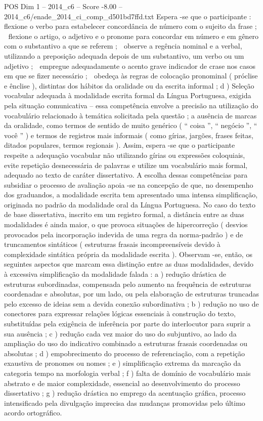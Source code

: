 \begin{textsample}{POS Dim 1 – 2014\_c6 – Score -8.00 – 2014\_c6/enade\_2014\_ci\_comp\_d501bd7ffd.txt}
Espera -se que o participante :  flexione o verbo para estabelecer concordância de número com o sujeito da frase ;  flexione o artigo, o adjetivo e o pronome para concordar em número e em gênero com o substantivo a que se referem ;  observe a regência nominal e a verbal, utilizando a preposição adequada depois de um substantivo, um verbo ou um adjetivo ;  empregue adequadamente o acento grave indicador de crase nos casos em que se fizer necessário ;  obedeça às regras de colocação pronominal ( próclise e ênclise ), distintas dos hábitos da oralidade ou da escrita informal ; d ) Seleção vocabular adequada à modalidade escrita formal da Língua Portuguesa, exigida pela situação comunicativa – essa competência envolve a precisão na utilização do vocabulário relacionado à temática solicitada pela questão ; a ausência de marcas da oralidade, como termos de sentido de muito genérico ( “ coisa ”, “ negócio ”, “ você ” ) e termos de registros mais informais ( como gírias, jargões, frases feitas, ditados populares, termos regionais ).
Assim, espera -se que o participante respeite a adequação vocabular não utilizando gírias ou expressões coloquiais, evite repetição desnecessária de palavras e utilize um vocabulário mais formal, adequado ao texto de caráter dissertativo.
A escolha dessas competências para subsidiar o processo de avaliação apoia -se na concepção de que, no desempenho dos graduandos, a modalidade escrita tem apresentado uma intensa simplificação, originada no padrão da modalidade oral da Língua Portuguesa.
No caso do texto de base dissertativa, inscrito em um registro formal, a distância entre as duas modalidades é ainda maior, o que provoca situações de hipercorreção ( desvios provocados pela incorporação indevida de uma regra da norma-padrão ) e de truncamentos sintáticos ( estruturas frasais incompreensíveis devido à complexidade sintática própria da modalidade escrita ).
Observam -se, então, os seguintes aspectos que marcam essa distinção entre as duas modalidades, devido à excessiva simplificação da modalidade falada : a ) redução drástica de estruturas subordinadas, compensada pelo aumento na frequência de estruturas coordenadas e absolutas, por um lado, ou pela elaboração de estruturas truncadas pelo excesso de ideias sem a devida conexão subordinativa ; b ) redução no uso de conectores para expressar relações lógicas essenciais à construção do texto, substituídas pela exigência de inferência por parte do interlocutor para suprir a sua ausência ; c ) redução cada vez maior do uso do subjuntivo, ao lado da ampliação do uso do indicativo combinado a estruturas frasais coordenadas ou absolutas ; d ) empobrecimento do processo de referenciação, com a repetição exaustiva de pronomes ou nomes ; e ) simplificação extrema da marcação da categoria tempo na morfologia verbal ; f ) falta de domínio de vocabulário mais abstrato e de maior complexidade, essencial ao desenvolvimento do processo dissertativo ; g ) redução drástica no emprego da acentuação gráfica, processo intensificado pela divulgação imprecisa das mudanças promovidas pelo último acordo ortográfico.

\end{textsample}
